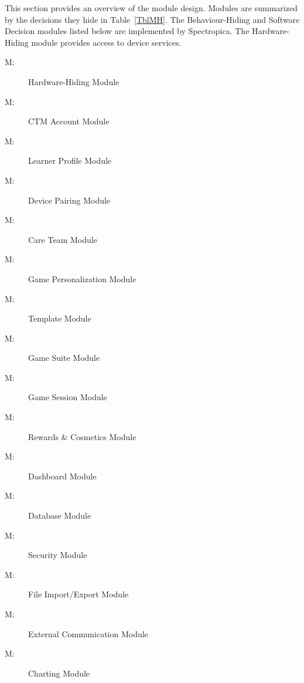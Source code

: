 \documentclass[12pt, titlepage]{article}
\newcounter{mnum}
\newcommand{\mthemnum}{M\themnum}
\begin{document}
This section provides an overview of the module design. Modules are summarized
by the decisions they hide in Table~\ref{TblMH}. The Behaviour-Hiding and
Software Decision modules listed below are implemented by Spectropica.
The Hardware-Hiding module provides access to device services.

\begin{description}
\item [ \mthemnum \label{mHH}:] Hardware-Hiding Module
\item [ \mthemnum \label{mCTMAccount}:] CTM Account Module
\item [ \mthemnum \label{mLearnerProfile}:] Learner Profile Module
\item [ \mthemnum \label{mDevicePairing}:] Device Pairing Module
\item [ \mthemnum \label{mCareTeam}:] Care Team Module
\item [ \mthemnum \label{mGamePersonalization}:] Game Personalization Module
\item [ \mthemnum \label{mTemplate}:] Template Module
\item [ \mthemnum \label{mGameSuite}:] Game Suite Module
\item [ \mthemnum \label{mGameSession}:] Game Session Module
\item [ \mthemnum \label{mRewards}:] Rewards \& Cosmetics Module
\item [ \mthemnum \label{mDashboard}:] Dashboard Module
\item [ \mthemnum \label{mDatabase}:] Database Module
\item [ \mthemnum \label{mSecurity}:] Security Module
\item [ \mthemnum \label{mFileIO}:] File Import/Export Module
\item [ \mthemnum \label{mExtComm}:] External Communication Module
\item [ \mthemnum \label{mCharting}:] Charting Module
\end{description}
\end{document}
